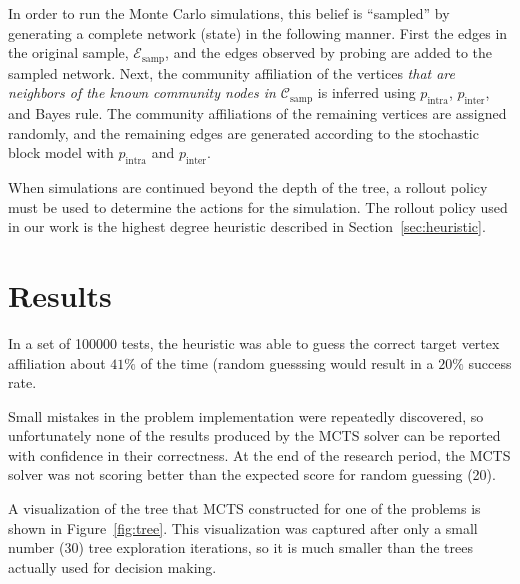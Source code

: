 \documentclass{IEEEtran}
\newcommand{\Es}{\ensuremath{\mathcal{E}_\text{samp}}}
\newcommand{\Coms}{\ensuremath{\mathcal{C}_\text{samp}}}
\begin{document}
In order to run the Monte Carlo simulations, this belief is ``sampled'' by generating a complete network (state) in the following manner. First the edges in the original sample, $\Es$, and the edges observed by probing are added to the sampled network. Next, the community affiliation of the vertices \emph{that are neighbors of the known community nodes in $\Coms$} is inferred using $p_\text{intra}$, $p_\text{inter}$, and Bayes rule. The community affiliations of the remaining vertices are assigned randomly, and the remaining edges are generated according to the stochastic block model with $p_\text{intra}$ and $p_\text{inter}$.

When simulations are continued beyond the depth of the tree, a rollout policy must be used to determine the actions for the simulation. The rollout policy used in our work is the highest degree heuristic described in Section~\ref{sec:heuristic}.

\section{Results}

In a set of 100000 tests, the heuristic was able to guess the correct target vertex affiliation about $41\%$ of the time (random guesssing would result in a $20\%$ success rate.

Small mistakes in the problem implementation were repeatedly discovered, so unfortunately none of the results produced by the MCTS solver can be reported with confidence in their correctness. At the end of the research period, the MCTS solver was not scoring better than the expected score for random guessing (20).

A visualization of the tree that MCTS constructed for one of the problems is shown in Figure~\ref{fig:tree}. This visualization was captured after only a small number (30) tree exploration iterations, so it is much smaller than the trees actually used for decision making.
\end{document}
